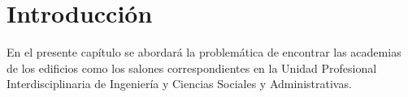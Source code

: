 \chapter{Introducción}
En el presente capítulo se abordará la problemática de encontrar las academias de los edificios como los salones correspondientes en la Unidad Profesional Interdisciplinaria de Ingeniería y Ciencias Sociales y Administrativas.

	
	
	
	